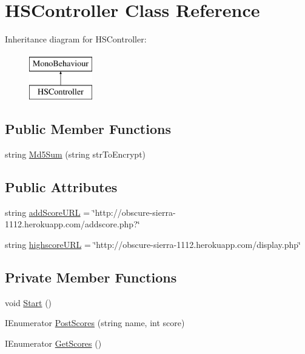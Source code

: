 \hypertarget{class_h_s_controller}{\section{H\-S\-Controller Class Reference}
\label{class_h_s_controller}
}
Inheritance diagram for H\-S\-Controller\-:\begin{figure}[H]
\begin{center}
\leavevmode
\includegraphics[height=2.000000cm]{class_h_s_controller}
\end{center}
\end{figure}
\subsection*{Public Member Functions}
\begin{DoxyCompactItemize}
\item 
string \hyperlink{class_h_s_controller_a600035d811db21a2a3380c292b3c4e9f}{Md5\-Sum} (string str\-To\-Encrypt)
\end{DoxyCompactItemize}
\subsection*{Public Attributes}
\begin{DoxyCompactItemize}
\item 
string \hyperlink{class_h_s_controller_a0085dc21a81423ef8320f567f77cc8a5}{add\-Score\-U\-R\-L} = \char`\"{}http\-://obscure-\/sierra-\/1112.herokuapp.\-com/addscore.\-php?\char`\"{}
\item 
string \hyperlink{class_h_s_controller_a93e0dc2ed28bdd7d165934abc0a04545}{highscore\-U\-R\-L} = \char`\"{}http\-://obscure-\/sierra-\/1112.herokuapp.\-com/display.\-php\char`\"{}
\end{DoxyCompactItemize}
\subsection*{Private Member Functions}
\begin{DoxyCompactItemize}
\item 
void \hyperlink{class_h_s_controller_ad9bf5c196ec145b5475cd4b6a6c8909a}{Start} ()
\item 
I\-Enumerator \hyperlink{class_h_s_controller_a70db2c7b40c2f57db06c2e284bbd557b}{Post\-Scores} (string name, int score)
\item 
I\-Enumerator \hyperlink{class_h_s_controller_a91ca22b500452be2f96da94cb549dbc9}{Get\-Scores} ()
\end{DoxyCompactItemize}
